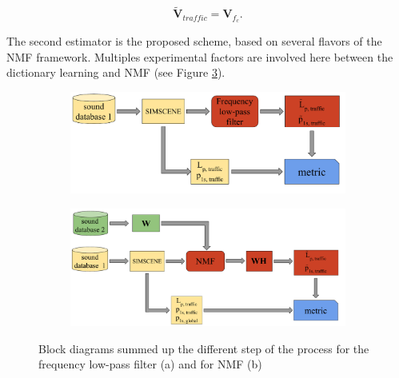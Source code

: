 \documentclass[twocolumn,a4paper,10pt]{article}
\begin{document}
\begin{equation}\label{eq:v_tr_filtered}
\mathbf{\tilde{V}}_{traffic} = \mathbf{V}_{f_c}.
\end{equation}

The second estimator is the proposed scheme, based on several flavors of the NMF framework. Multiples experimental factors are involved here between the dictionary learning and NMF (see Figure \ref{fig:bloc_nmf}).

\begin{figure}

    \centering
    \begin{subfigure}[t]{0.45\textwidth}
        \centering
        \includegraphics[width=\linewidth]{figures/bloc_diagram_filtrage_EN.pdf}
  		\caption{}
  		\label{fig:bloc_filtre}
    \end{subfigure}%
    \vfill
    \begin{subfigure}[t]{0.45\textwidth}
        \centering
        \includegraphics[width=\linewidth]{figures/bloc_diagram_NMF_EN.pdf}
		\caption{}
		\label{fig:bloc_nmf}
    \end{subfigure}

    \caption{Block diagrams summed up the different step of the process for the frequency low-pass filter (a) and for NMF (b)}
\end{figure}
\end{document}
